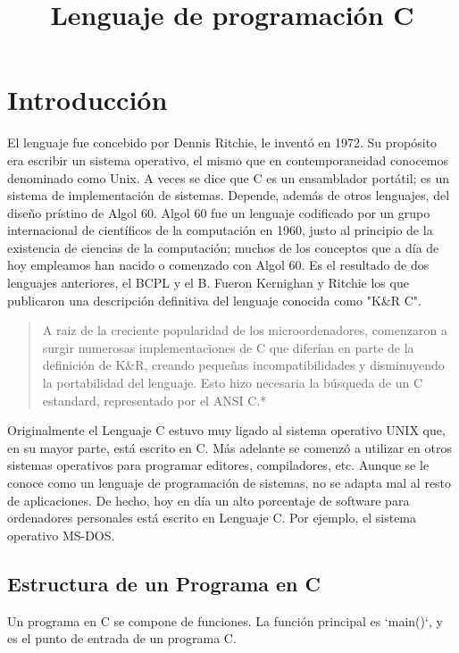 \documentclass{article}
\begin{document}
\title{Lenguaje de programación C}
\maketitle
\section{Introducción}

El lenguaje fue concebido por Dennis Ritchie, le inventó en 1972. Su propósito era escribir un sistema operativo, el mismo que en contemporaneidad conocemos denominado como Unix. A veces se dice que C es un ensamblador portátil; es un sistema de implementación de sistemas. Depende, además de otros lenguajes, del diseño prístino de Algol 60. Algol 60 fue un lenguaje codificado por un grupo internacional de científicos de la computación en 1960, justo al principio de la existencia de ciencias de la computación; muchos de los conceptos que a día de hoy empleamos han nacido o comenzado con Algol 60. Es el resultado de dos lenguajes anteriores, el BCPL y el B. Fueron Kernighan y Ritchie los que publicaron una descripción definitiva del lenguaje conocida como "K\&R C". \\

\begin{quotation}
A raiz de la creciente popularidad de los microordenadores, comenzaron a surgir numerosas implementaciones de C que diferían en parte de la definición de K\&R, creando pequeñas incompatibilidades y disminuyendo la portabilidad del lenguaje. Esto hizo necesaria la búsqueda de un C estandard, representado por el ANSI C.*\\
\end{quotation}

Originalmente el Lenguaje C estuvo muy ligado al sistema operativo UNIX que, en su mayor parte, está escrito en C. Más adelante se comenzó a utilizar en otros sistemas operativos para programar editores, compiladores, etc. Aunque se le conoce como un lenguaje de programación de sistemas, no se adapta mal al resto de aplicaciones. De hecho, hoy en día un alto porcentaje de software para ordenadores personales está escrito en Lenguaje C. Por ejemplo, el sistema operativo MS-DOS.

\subsection{Estructura de un Programa en C}
Un programa en C se compone de funciones. La función principal es `main()`, y es el punto de entrada de un programa C.
\end{document}
